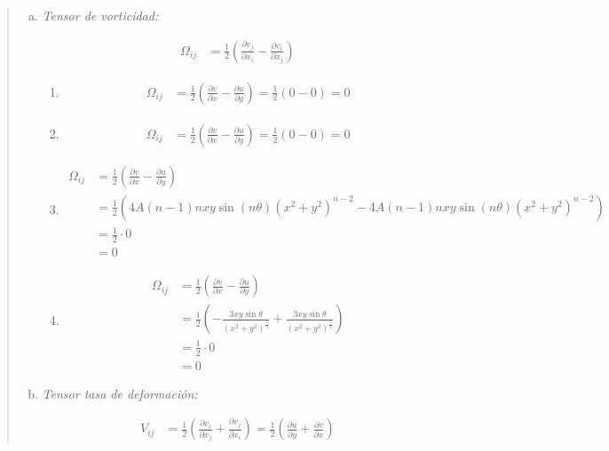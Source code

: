 \documentclass[a4paper,10pt,twoside,final,spanish]{article}
\begin{document}
\begin{quote}
\begin{enumerate}[a)]
\item \textit{Tensor de vorticidad:}

\begin{align*}
\Omega_{ij} &= \frac{1}{2}\left(\frac{\partial v_{j}}{\partial x_{i}}
- \frac{\partial v_{i}}{\partial x_{j}}\right)
\end{align*}
	
	\begin{enumerate}[$\Psi$a.]
	\item
	\begin{align*}
	\Omega_{ij} &= \frac{1}{2}\left(\frac{\partial v}{\partial x}
	-\frac{\partial u}{\partial y}\right)
	=\frac{1}{2}(0-0)=0
	\end{align*}
	
	\item
	\begin{align*}
	\Omega_{ij} &= \frac{1}{2}\left(\frac{\partial v}{\partial x}
	-\frac{\partial u}{\partial y}\right)
	=\frac{1}{2}(0-0)=0
	\end{align*}
	
	\item 
	\begin{align*}
	\Omega_{ij} &= \frac{1}{2}\left(\frac{\partial v}{\partial x}
	-\frac{\partial u}{\partial y}\right) \\
	&= \frac{1}{2}\left(4A(n-1)nxy\sin{(n\theta)}(x^{2}+y^{2})^{n-2}
	-4A(n-1)nxy\sin{(n\theta)}(x^{2}+y^{2})^{n-2}\right) \\
	&= \frac{1}{2}\cdot 0 \\
	&= 0
	\end{align*}
	
	\item
	\begin{align*}
	\Omega_{ij} &= \frac{1}{2}\left(\frac{\partial v}{\partial x}
	-\frac{\partial u}{\partial y}\right) \\
	&= \frac{1}{2}\left(-\frac{3xy\sin{\theta}}{(x^{2}+y^{2})^{\frac{5}{2}}}
	+\frac{3xy\sin{\theta}}{(x^{2}+y^{2})^{\frac{5}{2}}}\right) \\
	&= \frac{1}{2}\cdot 0 \\
	&= 0
	\end{align*}
	\end{enumerate}

\item \textit{Tensor tasa de deformación:}

\begin{align*}
V_{ij} &= \frac{1}{2}\left(\frac{\partial v_{i}}{\partial x_{j}}
+ \frac{\partial v_{j}}{\partial x_{i}}\right)
=\frac{1}{2}\left(\frac{\partial u}{\partial y}
+ \frac{\partial v}{\partial x}\right)
\end{align*}


\end{enumerate}
\end{quote}
\end{document}
